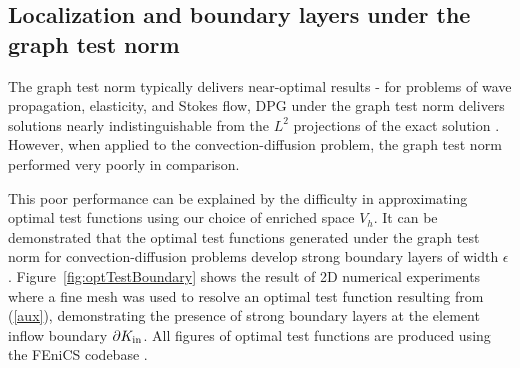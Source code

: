 \documentclass[11pt,onecolumn]{scrartcl}
\newcommand{\LRp}[1]{\left( #1 \right)}
\newcommand{\grad}{\nabla}
\renewcommand{\div}{\grad \cdot}
\begin{document}
%

\subsection{Localization and boundary layers under the graph test norm}

The graph test norm typically delivers near-optimal results - for problems of wave propagation, elasticity, and Stokes flow, DPG under the graph test norm delivers solutions nearly indistinguishable from the $L^2$ projections of the exact solution \cite{DPG4, DPGElas, stokesDPG}.  However, when applied to the convection-diffusion problem, the graph test norm performed very poorly in comparison.

This poor performance can be explained by the difficulty in approximating optimal test functions using our choice of enriched space $V_h$.  It can be demonstrated that the optimal test functions generated under the graph test norm for convection-diffusion problems develop strong boundary layers of width $\epsilon$.  Figure~\ref{fig:optTestBoundary} shows the result of 2D numerical experiments where a fine mesh was used to resolve an optimal test function resulting from (\ref{aux}), demonstrating the presence of strong boundary layers at the element inflow boundary $\partial K_{\rm in}$.  All figures of optimal test functions are produced using the FEniCS codebase \cite{LoggMardalEtAl2012a}.
\end{document}
